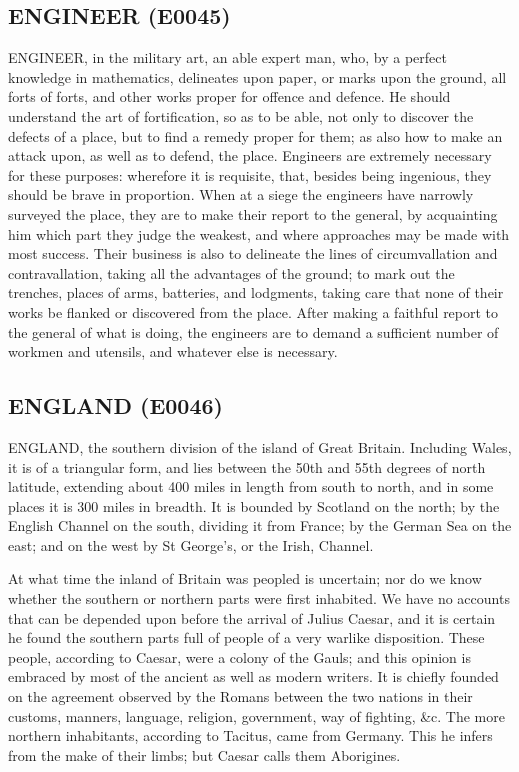 \documentclass{article}
\begin{document}
\subsection*{ENGINEER (E0045)}
ENGINEER, in the military art, an able expert man, who, by a perfect knowledge in mathematics, delineates upon paper, or marks upon the ground, all forts of forts, and other works proper for offence and defence. He should understand the art of fortification, so as to be able, not only to discover the defects of a place, but to find a remedy proper for them; as also how to make an attack upon, as well as to defend, the place. Engineers are extremely necessary for these purposes: wherefore it is requisite, that, besides being ingenious, they should be brave in proportion. When at a siege the engineers have narrowly surveyed the place, they are to make their report to the general, by acquainting him which part they judge the weakest, and where approaches may be made with most success. Their business is also to delineate the lines of circumvallation and contravallation, taking all the advantages of the ground; to mark out the trenches, places of arms, batteries, and lodgments, taking care that none of their works be flanked or discovered from the place. After making a faithful report to the general of what is doing, the engineers are to demand a sufficient number of workmen and utensils, and whatever else is necessary.

\subsection*{ENGLAND (E0046)}
ENGLAND, the southern division of the island of Great Britain. Including Wales, it is of a triangular form, and lies between the 50th and 55th degrees of north latitude, extending about 400 miles in length from south to north, and in some places it is 300 miles in breadth. It is bounded by Scotland on the north; by the English Channel on the south, dividing it from France; by the German Sea on the east; and on the west by St George's, or the Irish, Channel.

At what time the inland of Britain was peopled is uncertain; nor do we know whether the southern or northern parts were first inhabited. We have no accounts that can be depended upon before the arrival of Julius Caesar, and it is certain he found the southern parts full of people of a very warlike disposition. These people, according to Caesar, were a colony of the Gauls; and this opinion is embraced by most of the ancient as well as modern writers. It is chiefly founded on the agreement observed by the Romans between the two nations in their customs, manners, language, religion, government, way of fighting, \&c. The more northern inhabitants, according to Tacitus, came from Germany. This he infers from the make of their limbs; but Caesar calls them Aborigines.
\end{document}
